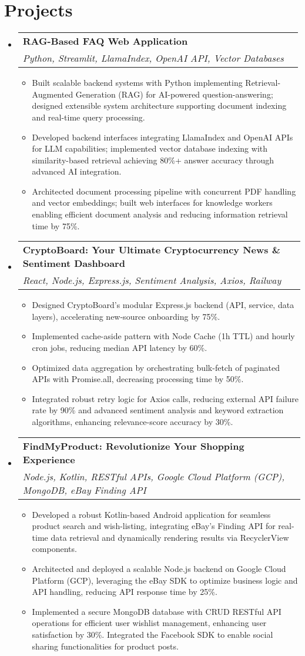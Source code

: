 \documentclass[letterpaper,10pt]{article}
\makeatletter
\newcommand{\resumeItem}[1]{
  \item\small{
    {#1 \vspace{-2pt}}
  }
}
\newcommand{\resumeSubheading}[4]{
  \vspace{-2pt}\item
    \begin{tabular*}{1.0\textwidth}[t]{l@{\extracolsep{\fill}}r}
      \textbf{#1} & \textbf{\small #2} \\
      \textit{\small#3} & \textit{\small #4} \\
    \end{tabular*}\vspace{-7pt}
}
\newcommand{\resumeSubHeadingListStart}{\begin{itemize}[leftmargin=0.15in, label={}]}
\newcommand{\resumeSubHeadingListEnd}{\end{itemize}}
\newcommand{\resumeItemListStart}{\begin{itemize}[leftmargin=*, itemsep=-1pt]}
\newcommand{\resumeItemListEnd}{\end{itemize}\vspace{-5pt}}
\makeatother
\begin{document}
\section{Projects}
\resumeSubHeadingListStart
  \resumeSubheading
    {RAG-Based FAQ Web Application}{}
    {Python, Streamlit, LlamaIndex, OpenAI API, Vector Databases}{}
    \resumeItemListStart
      \resumeItem{Built scalable backend systems with Python implementing Retrieval-Augmented Generation (RAG) for AI-powered question-answering; designed extensible system architecture supporting document indexing and real-time query processing.}
      \resumeItem{Developed backend interfaces integrating LlamaIndex and OpenAI APIs for LLM capabilities; implemented vector database indexing with similarity-based retrieval achieving 80\%+ answer accuracy through advanced AI integration.}
      \resumeItem{Architected document processing pipeline with concurrent PDF handling and vector embeddings; built web interfaces for knowledge workers enabling efficient document analysis and reducing information retrieval time by 75\%.}
    \resumeItemListEnd
\vspace{-5pt}
  \resumeSubheading
    {CryptoBoard: Your Ultimate Cryptocurrency News \& Sentiment Dashboard}{}
    {React, Node.js, Express.js, Sentiment Analysis, Axios, Railway}{}
    \resumeItemListStart
      \resumeItem{Designed CryptoBoard's modular Express.js backend (API, service, data layers), accelerating new-source onboarding by 75\%.}
      \resumeItem{Implemented cache-aside pattern with Node Cache (1h TTL) and hourly cron jobs, reducing median API latency by 60\%.}
      \resumeItem{Optimized data aggregation by orchestrating bulk-fetch of paginated APIs with Promise.all, decreasing processing time by 50\%.}
      \resumeItem{Integrated robust retry logic for Axios calls, reducing external API failure rate by 90\% and advanced sentiment analysis and keyword extraction algorithms, enhancing relevance-score accuracy by 30\%.}
    \resumeItemListEnd
\vspace{-5pt}
  \resumeSubheading
    {FindMyProduct: Revolutionize Your Shopping Experience}{}
    {Node.js, Kotlin, RESTful APIs, Google Cloud Platform (GCP), MongoDB, eBay Finding API}{}
    \resumeItemListStart
      \resumeItem{Developed a robust Kotlin-based Android application for seamless product search and wish-listing, integrating eBay's Finding API for real-time data retrieval and dynamically rendering results via RecyclerView components.}
      \resumeItem{Architected and deployed a scalable Node.js backend on Google Cloud Platform (GCP), leveraging the eBay SDK to optimize business logic and API handling, reducing API response time by 25\%.}
      \resumeItem{Implemented a secure MongoDB database with CRUD RESTful API operations for efficient user wishlist management, enhancing user satisfaction by 30\%. Integrated the Facebook SDK to enable social sharing functionalities for product posts.}
    \resumeItemListEnd
\resumeSubHeadingListEnd
\vspace{0pt}
\end{document}
